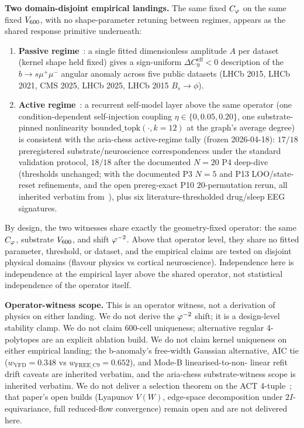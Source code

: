 \textbf{Two domain-disjoint empirical landings.} The same fixed
$C_{\varphi}$ on the same fixed $V_{600}$, with no shape-parameter
retuning between regimes, appears as the shared response
primitive underneath:
\begin{enumerate}\itemsep=2pt
\item \textbf{Passive regime}~\citep{SmartBAnomaly2026}: a single
  fitted dimensionless amplitude $A$ per dataset (kernel shape
  held fixed) gives a sign-uniform
  $\Delta C_{9}^{\mathrm{eff}} < 0$ description of the
  $b\to s\mu^{+}\mu^{-}$ angular anomaly across five public
  datasets (LHCb 2015, LHCb 2021, CMS 2025, LHCb 2025, LHCb 2015
  $B_s\to\phi$).
\item \textbf{Active regime}~\citep{SmartAriaChess2026}: a
  recurrent self-model layer above the same operator (one
  condition-dependent self-injection coupling
  $\eta\in\{0,0.05,0.20\}$, one substrate-pinned nonlinearity
  $\mathrm{bounded\_topk}(\cdot, k=12)$ at the graph's average
  degree) is consistent with the aria-chess active-regime tally
  (frozen 2026-04-18): $17/18$ preregistered
  substrate/neuroscience correspondences under the standard
  validation protocol, $18/18$ after the documented $N\!=\!20$
  P4 deep-dive (thresholds unchanged; with the documented P3
  $N\!=\!5$ and P13 LOO/state-reset refinements, and the open
  prereg-exact P10 $20$-permutation rerun, all inherited verbatim
  from~\citep{SmartAriaChess2026}), plus six
  literature-thresholded drug/sleep EEG signatures.
\end{enumerate}
By design, the two witnesses share exactly the geometry-fixed
operator: the same $C_{\varphi}$, substrate $V_{600}$, and shift
$\varphi^{-2}$. Above that operator level, they share no fitted
parameter, threshold, or dataset, and the empirical claims are
tested on disjoint physical domains (flavour physics vs cortical
neuroscience). Independence here is
independence at the empirical layer above the shared operator,
not statistical independence of the operator itself.

\textbf{Operator-witness scope.} This is an operator witness, not
a derivation of physics on either landing. We do not derive the
$\varphi^{-2}$ shift; it is a design-level stability clamp. We do not
claim 600-cell uniqueness; alternative regular 4-polytopes are an
explicit ablation build. We do not claim kernel uniqueness on
either empirical landing; the b-anomaly's free-width Gaussian
alternative, AIC tie ($w_{\mathrm{VFD}}=0.348$ vs
$w_{\mathrm{FREE\_C9}}=0.652$), and Mode-B linearised-to-non-
linear refit drift caveats are inherited verbatim, and the
aria-chess substrate-witness scope is inherited verbatim. We do
not deliver a selection theorem on the ACT
4-tuple~\citep{SmartAdaptiveClosureTransport2026}; that paper's
open builds (Lyapunov $V(W)$, edge-space decomposition under
$2I$-equivariance, full reduced-flow convergence) remain open and
are not delivered here.

